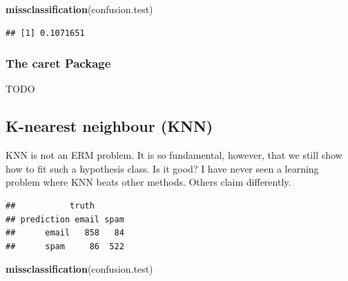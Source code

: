 \documentclass[]{book}
\newenvironment{Shaded}{\begin{snugshade}}{\end{snugshade}}
\newcommand{\KeywordTok}[1]{\textcolor[rgb]{0.13,0.29,0.53}{\textbf{#1}}}
\newcommand{\DataTypeTok}[1]{\textcolor[rgb]{0.13,0.29,0.53}{#1}}
\newcommand{\DecValTok}[1]{\textcolor[rgb]{0.00,0.00,0.81}{#1}}
\newcommand{\StringTok}[1]{\textcolor[rgb]{0.31,0.60,0.02}{#1}}
\newcommand{\CommentTok}[1]{\textcolor[rgb]{0.56,0.35,0.01}{\textit{#1}}}
\newcommand{\OperatorTok}[1]{\textcolor[rgb]{0.81,0.36,0.00}{\textbf{#1}}}
\newcommand{\NormalTok}[1]{#1}
\theoremstyle{definition}
\theoremstyle{definition}
\theoremstyle{definition}
\theoremstyle{remark}
\begin{document}
\begin{Shaded}
\begin{Highlighting}[]
\KeywordTok{missclassification}\NormalTok{(confusion.test)}
\end{Highlighting}
\end{Shaded}

\begin{verbatim}
## [1] 0.1071651
\end{verbatim}

\subsubsection{The caret Package}\label{the-caret-package}

TODO

\subsection{K-nearest neighbour (KNN)}\label{k-nearest-neighbour-knn}

KNN is not an ERM problem. It is so fundamental, however, that we still
show how to fit such a hypothesis class. Is it good? I have never seen a
learning problem where KNN beats other methods. Others claim
differently.

\begin{Shaded}
\end{Shaded}

\begin{verbatim}
##           truth
## prediction email spam
##      email   858   84
##      spam     86  522
\end{verbatim}

\begin{Shaded}
\begin{Highlighting}[]
\KeywordTok{missclassification}\NormalTok{(confusion.test)}
\end{Highlighting}
\end{Shaded}
\end{document}
